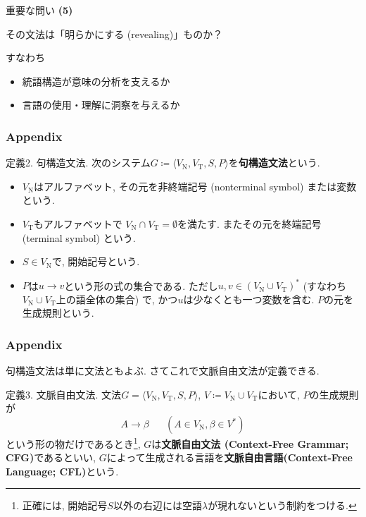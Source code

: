 \documentclass[dvipdfmx, xcolor={dvipsnames},12pt]{beamer}
\begin{document}
\begin{frame}{重要な問い}
\textbf{(5)}\\
\begin{block}{}
その文法は「明らかにする (revealing)」ものか？\\
\end{block}
すなわち
\begin{itemize}
    \item 統語構造が意味の分析を支えるか
    \item 言語の使用・理解に洞察を与えるか
\end{itemize}
\end{frame}

\begin{frame}
\frametitle{Appendix}
\begin{dfn}{定義2. 句構造文法.}
次のシステム$G\coloneq\langle V_\text{N}, V_\text{T}, S, P\rangle$を\textbf{句構造文法}という.
\begin{itemize}
\item $V_\text{N}$はアルファベット, その元を非終端記号 (nonterminal symbol) または変数という.
\item $V_\text{T}$もアルファベットで $V_\text{N}\cap V_\text{T}=\emptyset$を満たす. またその元を終端記号 (terminal symbol) という.
\item $S\in V_\text{N}$で, 開始記号という.
\item $P$は$u\to v$という形の式の集合である. ただし$u,v\in (V_\text{N}\cup V_\text{T})^*$ (すなわち$V_\text{N}\cup V_\text{T}$上の語全体の集合) で, かつ$u$は少なくとも一つ変数を含む. $P$の元を生成規則という.
\end{itemize}
\end{dfn}
\end{frame}

\begin{frame}
\frametitle{Appendix}
句構造文法は単に文法ともよぶ. さてこれで文脈自由文法が定義できる.

\begin{dfn}{定義3. 文脈自由文法.}
文法$G=\langle V_\text{N}, V_\text{T}, S, P\rangle$, $V\coloneq V_\text{N}\cup V_\text{T}$において, $P$の生成規則が
\[
A\to \beta \hspace{20pt}(A\in V_\text{N}, \beta\in V^*)
\]
という形の物だけであるとき\footnote{正確には, 開始記号$S$以外の右辺には空語$\lambda$が現れないという制約をつける.}, $G$は\textbf{文脈自由文法 (Context-Free Grammar; CFG)}であるといい, $G$によって生成される言語を\textbf{文脈自由言語(Context-Free Language; CFL)}という.
\end{dfn}
\end{frame}
\end{document}
